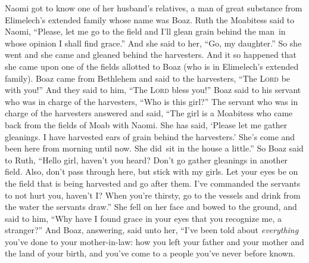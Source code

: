 
\begin{inparaenum}
     Naomi got to know one of her husband's relatives, a man of great substance from Elimelech's extended family whose name was Boaz.%
     Ruth the Moabitess said to Naomi, ``Please, let me go to the field and I'll glean grain behind the man\understood\ in whose opinion I shall find grace.'' And she said to her, ``Go, my daughter.''%
     So she went and she came and gleaned behind the harvesters. And it so happened that she came upon one of the fields allotted to Boaz (who is in Elimelech's extended family).%
     Boaz came from Bethlehem and said to the harvesters, ``The \textsc{Lord} be with you!'' And they said to him, ``The \textsc{Lord} bless you!''%
     Boaz said to his servant who was in charge of the harvesters, ``Who is this girl?''%
     The servant who was in charge of the harvesters answered and said, ``The girl is a Moabitess who came back from the fields of Moab with Naomi.%
     She has said, `Please let me gather gleanings. I have harvested ears of grain behind the harvesters.' She's come and been here from morning until now. She did\understood\ sit in the house a little.''%
     So Boaz said to Ruth, ``Hello girl, haven't you heard? Don't go gather gleanings in another field. Also, don't pass through here, but stick with my girls.%
     Let your eyes be on the field that is being harvested and go after them. I've commanded the servants to not hurt you, haven't I? When you're thirsty, go to the vessels and drink from the water\understood{} the servants draw.''%
     She fell on her face and bowed to the ground, and said to him, ``Why have I found grace in your eyes that you recognize me, a stranger?''%
     And Boaz, answering, said unto her, ``I've been told about \emph{everything} you've done to your mother-in-law: how you left your father and your mother and the land of your birth, and you've come to a people you've never before known.%

\end{inparaenum}
